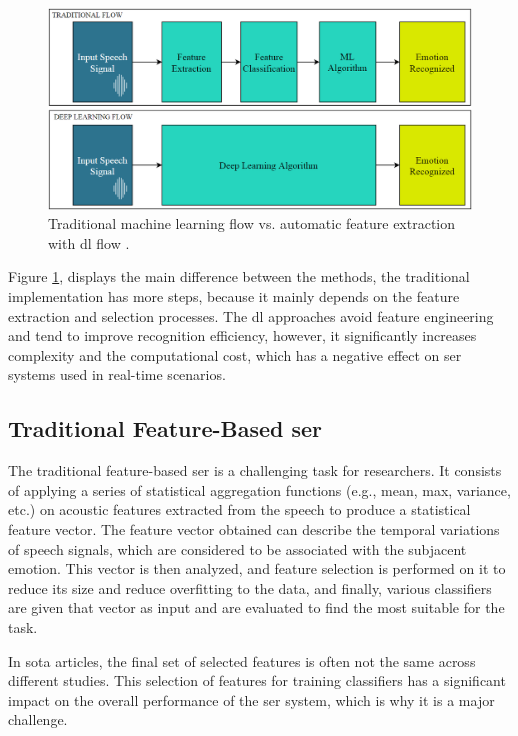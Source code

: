 \begin{figure}[h]
  \centering
  \includegraphics[width=\linewidth]{figs/2_state_of_the_art/methods.png}
  \caption{Traditional machine learning flow vs. automatic feature extraction with \ac{dl} flow \cite{Khalil2019}.}
  \label{fig:methods}
\end{figure}

Figure \ref{fig:methods}, displays the main difference between the methods, the traditional implementation has more steps, because it mainly depends on the feature extraction and selection processes. The \ac{dl} approaches avoid feature engineering and tend to improve recognition efficiency, however, it significantly increases complexity and the computational cost, which has a negative effect on \ac{ser} systems used in real-time scenarios.

\subsection{Traditional Feature-Based \ac{ser}}

The traditional feature-based \ac{ser} is a challenging task for researchers. It consists of applying a series of statistical aggregation functions (e.g., mean, max, variance, etc.) on acoustic features extracted from the speech to produce a statistical feature vector. The feature vector obtained can describe the temporal variations of speech signals, which are considered to be associated with the subjacent emotion. This vector is then analyzed, and feature selection is performed on it to reduce its size and reduce overfitting to the data, and finally, various classifiers are given that vector as input and are evaluated to find the most suitable for the task.

In \ac{sota} articles, the final set of selected features is often not the same across different studies. This selection of features for training classifiers has a significant impact on the overall performance of the \ac{ser} system, which is why it is a major challenge.

